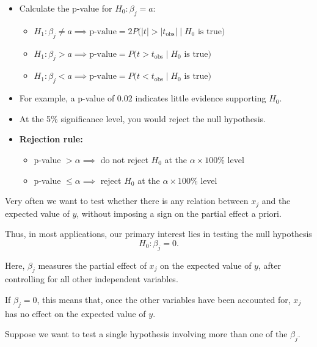 \begin{itemize}
    \item Calculate the p-value for $H_0 : \beta_j = a$:
    \begin{itemize}
        \item $H_1 : \beta_j \ne a \implies \text{p-value} = 2 P\big(|t| > |t_{\text{obs}}| \mid H_0 \text{ is true}\big)$
        \item $H_1 : \beta_j > a \implies \text{p-value} = P\big(t > t_{\text{obs}} \mid H_0 \text{ is true}\big)$
        \item $H_1 : \beta_j < a \implies \text{p-value} = P\big(t < t_{\text{obs}} \mid H_0 \text{ is true}\big)$
    \end{itemize}
    
    \item For example, a p-value of $0.02$ indicates little evidence supporting $H_0$.
    
    \item At the 5\% significance level, you would reject the null hypothesis.
    
    \item \textbf{Rejection rule:}
    \begin{itemize}
        \item p-value $> \alpha \implies$ do not reject $H_0$ at the $\alpha \times 100\%$ level
        \item p-value $\le \alpha \implies$ reject $H_0$ at the $\alpha \times 100\%$ level
    \end{itemize}
\end{itemize}

Very often we want to test whether there is any relation between $x_j$ and the expected value of $y$, without imposing a sign on the partial effect a priori.

Thus, in most applications, our primary interest lies in testing the null hypothesis
\[
H_0 : \beta_j = 0.
\]

Here, $\beta_j$ measures the partial effect of $x_j$ on the expected value of $y$, after controlling for all other independent variables.  

If $\beta_j = 0$, this means that, once the other variables have been accounted for, $x_j$ has no effect on the expected value of $y$.

\vspace{10pt}

Suppose we want to test a single hypothesis involving more than one of the $\beta_j$.  

